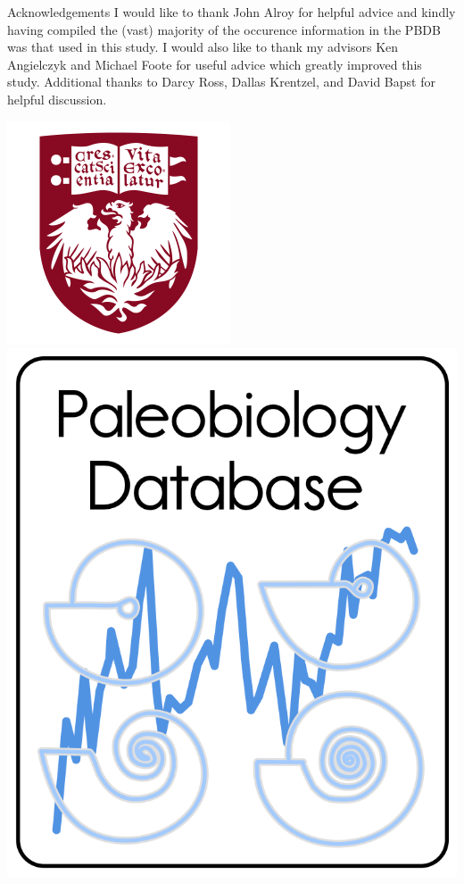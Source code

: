 \documentclass[final]{beamer}\usepackage[]{graphicx}\usepackage[]{color}
\newlength{\onecolwid}
\begin{document}
\begin{frame}[t]
\begin{columns}[t]
\begin{columns}[t,totalwidth = \onecolwid]
\begin{column}{\onecolwid}
        \begin{scriptsize}
          \tiny{
          \begin{block}{Acknowledgements}
            I would like to thank John Alroy for helpful advice and kindly having compiled the (vast) majority of the occurence information in the PBDB was that used in this study. I would also like to thank my advisors Ken Angielczyk and Michael Foote for useful advice which greatly improved this study. Additional thanks to Darcy Ross, Dallas Krentzel, and David Bapst for helpful discussion.
            \begin{center}
              \includegraphics[height = 0.05\textheight]{figure/chicago}
              \includegraphics[height = 0.05\textheight]{figure/pbdb}
            \end{center}
          \end{block}
          }
        \end{scriptsize}


\end{column}
\end{columns}
\end{columns}
\end{frame}
\end{document}
